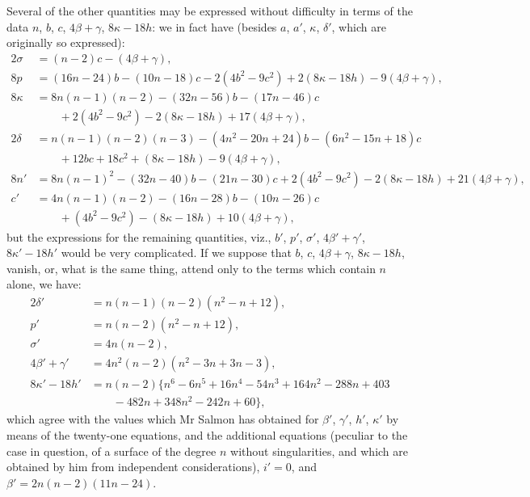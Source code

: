 \documentclass[11pt,a4paper]{book}
\theoremstyle{plain}
\begin{document}
Several of the other quantities may be expressed without difficulty in terms of the data $n$, $b$, $c$, $4\beta+\gamma$, $8\kappa-18h$: we in fact have (besides $a$, $a'$, $\kappa$, $\delta'$, which are originally so expressed):
\begin{align*}
2\sigma &= (n-2)c-(4\beta+\gamma),\\
8p &= (16n-24)b-(10n-18)c-2(4b^2-9c^2)+2(8\kappa-18h)-9(4\beta+\gamma),\\
8\kappa &= 8n(n-1)(n-2)-(32n-56)b-(17n-46)c\\
&\qquad +2(4b^2-9c^2)-2(8\kappa-18h)+17(4\beta+\gamma),\\
2\delta &= n(n-1)(n-2)(n-3)-(4n^2-20n+24)b-(6n^2-15n+18)c\\
&\qquad +12bc+18c^2+(8\kappa-18h)-9(4\beta+\gamma),\\
8n' &= 8n(n-1)^2-(32n-40)b-(21n-30)c+2(4b^2-9c^2)-2(8\kappa-18h)+21(4\beta+\gamma),\\
c' &= 4n(n-1)(n-2)-(16n-28)b-(10n-26)c\\
&\qquad +(4b^2-9c^2)-(8\kappa-18h)+10(4\beta+\gamma),
\end{align*}
but the expressions for the remaining quantities, viz., $b'$, $p'$, $\sigma'$, $4\beta'+\gamma'$, $8\kappa'-18h'$ would be very complicated. If we suppose that $b$, $c$, $4\beta+\gamma$, $8\kappa-18h$, vanish, or, what is the same thing, attend only to the terms which contain $n$ alone, we have:
\begin{align*}
2\delta' &= n(n-1)(n-2)(n^2-n+12),\\
p' &= n(n-2)(n^2-n+12),\\
\sigma' &= 4n(n-2),\\
4\beta'+\gamma' &= 4n^2(n-2)(n^2-3n+3n-3),\\
8\kappa'-18h' &= n(n-2)\{n^6-6n^5+16n^4-54n^3+164n^2-288n+403\\
&\qquad -482n+348n^2-242n+60\},
\end{align*}
which agree with the values which Mr Salmon has obtained for $\beta'$, $\gamma'$, $h'$, $\kappa'$ by means of the twenty-one equations, and the additional equations (peculiar to the case in question, of a surface of the degree $n$ without singularities, and which are obtained by him from independent considerations), $i'=0$, and $\beta'=2n(n-2)(11n-24)$.
\end{document}
